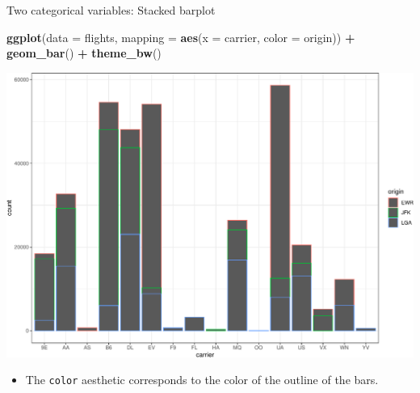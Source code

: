 \documentclass[
  ignorenonframetext,
]{beamer}
\newenvironment{Shaded}{\begin{snugshade}}{\end{snugshade}}
\newcommand{\AttributeTok}[1]{\textcolor[rgb]{0.13,0.29,0.53}{#1}}
\newcommand{\FunctionTok}[1]{\textcolor[rgb]{0.13,0.29,0.53}{\textbf{#1}}}
\newcommand{\NormalTok}[1]{#1}
\newcommand{\SpecialCharTok}[1]{\textcolor[rgb]{0.81,0.36,0.00}{\textbf{#1}}}
\providecommand{\tightlist}{%
  \setlength{\itemsep}{0pt}\setlength{\parskip}{0pt}}
\begin{document}
\begin{frame}[fragile]{Two categorical variables: Stacked barplot}
\protect\hypertarget{two-categorical-variables-stacked-barplot-1}{}
\tiny

\begin{Shaded}
\begin{Highlighting}[]
\FunctionTok{ggplot}\NormalTok{(}\AttributeTok{data =}\NormalTok{ flights, }\AttributeTok{mapping =} \FunctionTok{aes}\NormalTok{(}\AttributeTok{x =}\NormalTok{ carrier, }\AttributeTok{color =}\NormalTok{ origin)) }\SpecialCharTok{+}
  \FunctionTok{geom\_bar}\NormalTok{() }\SpecialCharTok{+} 
  \FunctionTok{theme\_bw}\NormalTok{()}
\end{Highlighting}
\end{Shaded}

\begin{center}\includegraphics[width=0.9\linewidth,height=0.5\textheight]{Week2_Lect_files/figure-beamer/unnamed-chunk-42-1} \end{center}
\normalsize

\begin{itemize}
\tightlist
\item
  The \texttt{color} aesthetic corresponds to the color of the outline
  of the bars.
\end{itemize}
\end{frame}
\end{document}
